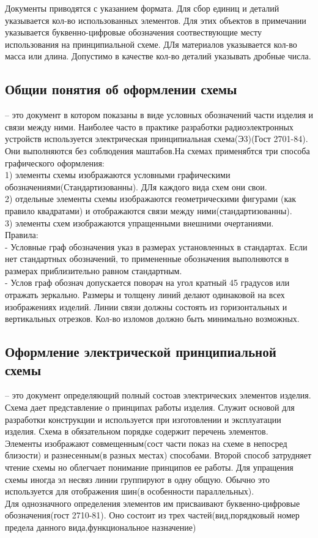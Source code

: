 \documentclass[a4paper, 12pt]{article}
\begin{document}
Документы приводятся с указанием формата. Для сбор единиц и деталий указывается кол-во использованных элементов. Для этих объектов в примечании указывается буквенно-цифровые обозначения соотвествующие месту использования на принципиальной схеме. ДЛя материалов указывается кол-во масса или длина. Допустимо в качестве кол-во деталий указывать дробные числа.\\

\subsection{Общии понятия об оформлении схемы}
-- это документ в котором показаны в виде условных обозначений части изделия и связи между ними. Наиболее часто в практике разработки радиоэлектронных устройств используется электрическая принципиальная схема(Э3)(Гост 2701-84). Они выполняются без соблюдения маштабов.На схемах применябтся три способа графического оформления:\\
1) элементы схемы изображаются условными графическими обозначениями(Стандартизованны). ДЛя каждого вида схем они свои.\\
2) отдельные элементы схемы изображаются геометрическими фигурами (как правило квадратами) и отображаются связи между ними(стандартизованны).\\
3) элементы схем изображаются упращенными внешними очертаниями.\\

Правила:\\
- Условные граф обозначения указ в размерах установленных в стандартах. Если нет стандартных обозначений, то примененные обозначения выполняются в размерах приблизительно равном стандартным.\\
- Услов граф обознач допускается поворач на угол кратный 45 градусов или отражать зеркально. Размеры и толщену линий делают одинаковой на всех изображениях изделий. Линии связи должны состоять из горизонтальных и вертикальных отрезков. Кол-во изломов должно быть минимально возможных.\\

\subsection{Оформление электрической принципиальной схемы}
-- это документ определяющий полный состоав электрических элементов изделия. Схема дает представление о принципах работы изделия. Служит основой для разработки конструкции и используется при изготовлении и эксплуатации изделия. Схема в обязательном порядке содержит перечень элементов.\\
Элементы изображают совмещенным(сост части показ на схеме в непосред близости) и разнесенным(в разных местах) способами. Второй способ затрудняет чтение схемы но облегчает понимание принципов ее работы. Для упращения схемы иногда эл несвяз линии группируют в одну общую. Обычно это используется для отображения шин(в особенности параллельных).\\
Для однозначного определения элементов им присваивают буквенно-цифровые обозначения(гост 2710-81). Оно состоит из трех частей(вид,порядковый номер предела данного вида,функциональное назначение)
\end{document}
